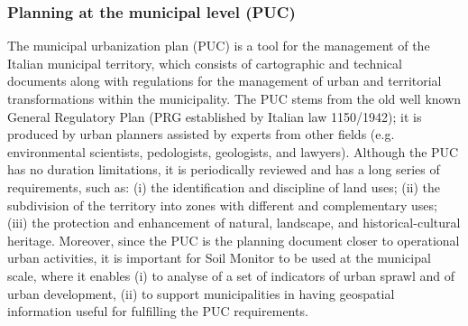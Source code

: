 \documentclass[APA,LATO1COL,doublespace]{WileyNJD-v2}
\newcommand{\toberevised}[1]{\emph{\textcolor{red}{#1}}} %
\begin{document}
\subsubsection{ Planning at the municipal level (PUC) }
\label{sec:caseCOM}

The municipal urbanization plan (PUC) is a tool for the management of the Italian municipal territory, which consists of cartographic and technical documents along with regulations for the management of urban and territorial transformations within the municipality.
The PUC stems from the old well known General Regulatory Plan (PRG established by Italian law 1150/1942); it is produced by urban planners assisted by experts from other fields (e.g. environmental scientists, pedologists, geologists, and lawyers).
Although the PUC has no duration limitations, it is periodically reviewed and has a long series of requirements, such as: (i) the identification and discipline of land uses; (ii) the subdivision of the territory into zones with different and complementary uses; (iii) the protection and enhancement of natural, landscape, and historical-cultural heritage. 
Moreover, since the PUC is the planning document closer to operational urban activities, it is important for Soil Monitor to be used at the municipal scale, where it enables (i) to analyse of a set of indicators of urban sprawl and of urban development, (ii) to support municipalities in having geospatial information useful for fulfilling the PUC requirements.
\end{document}
